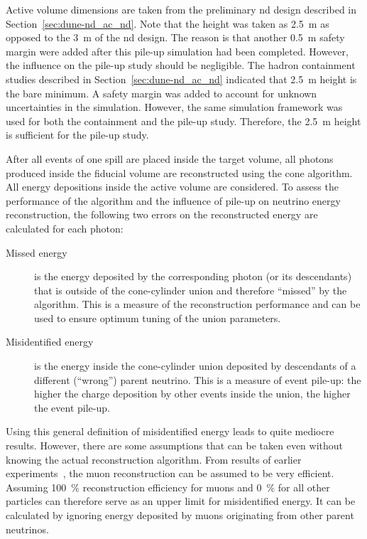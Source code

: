 Active volume dimensions are taken from the preliminary \dune{} \gls{nd} design described in Section~\ref{sec:dune-nd_ac_nd}.
Note that the height was taken as \SI{2.5}{\metre} as opposed to the \SI{3}{\metre} of the \gls{nd} design.
The reason is that another \SI{0.5}{\metre} safety margin were added after this pile-up simulation had been completed.
However, the influence on the pile-up study should be negligible.
The hadron containment studies described in Section~\ref{sec:dune-nd_ac_nd} indicated that \SI{2.5}{\metre} height is the bare minimum.
A safety margin was added to account for unknown uncertainties in the simulation.
However, the same simulation framework was used for both the containment and the pile-up study.
Therefore, the \SI{2.5}{\metre} height is sufficient for the pile-up study.

After all events of one spill are placed inside the target volume, all \Pgpz photons produced inside the fiducial volume are reconstructed using the cone algorithm.
All energy depositions inside the active volume are considered.
To assess the performance of the algorithm and the influence of pile-up on neutrino energy reconstruction, the following two errors on the reconstructed energy are calculated for each \Pgpz photon:
\begin{description}
	\item[Missed energy] is the energy deposited by the corresponding \Pgpz photon (or its descendants) that is outside of the cone-cylinder union and therefore ``missed'' by the algorithm.
		This is a measure of the reconstruction performance and can be used to ensure optimum tuning of the union parameters.
	\item[Misidentified energy] is the energy inside the cone-cylinder union deposited by descendants of a different (``wrong'') parent neutrino.
		This is a measure of event pile-up: the higher the charge deposition by other events inside the union, the higher the event pile-up.
\end{description}
Using this general definition of misidentified energy leads to quite mediocre results.
However, there are some assumptions that can be taken even without knowing the actual reconstruction algorithm.
From results of earlier experiments~\cite{pandora}, the muon reconstruction can be assumed to be very efficient.
Assuming \SI{100}{\percent} reconstruction efficiency for muons and \SI{0}{\percent} for all other particles can therefore serve as an upper limit for misidentified energy.
It can be calculated by ignoring energy deposited by muons originating from other parent neutrinos.

